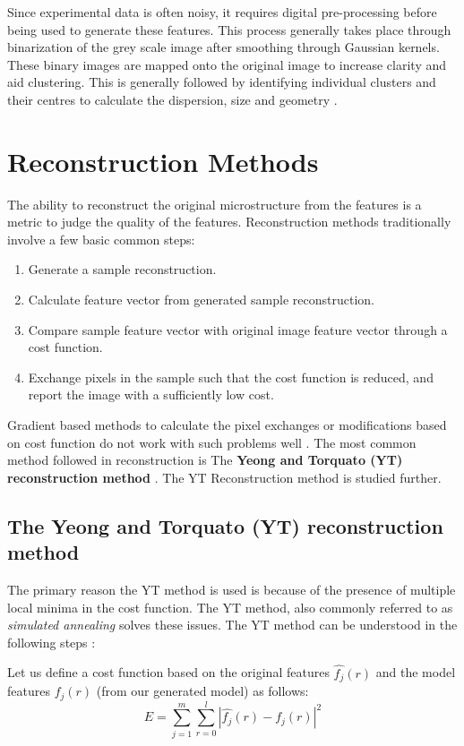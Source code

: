 \documentclass[12pt, a4paper]{report}
\begin{document}
Since experimental data is often noisy, it requires digital pre-processing before being used to generate these features. This process generally takes place through binarization of the grey scale image after smoothing through Gaussian kernels. These binary images are mapped onto the original image to increase clarity and aid clustering. This is generally followed by identifying individual clusters and their centres to calculate the dispersion, size and geometry \cite{16xu2014descriptor}. 

\section{Reconstruction Methods}
The ability to reconstruct the original microstructure from the features is a metric to judge the quality of the features. Reconstruction methods traditionally involve a few basic common steps:

\begin{enumerate}
    \item Generate a sample reconstruction.
    \item Calculate feature vector from generated sample reconstruction.
    \item Compare sample feature vector with original image feature vector through a cost function.
    \item Exchange pixels in the sample such that the cost function is reduced, and report the image with a sufficiently low cost.
\end{enumerate}

Gradient based methods to calculate the pixel exchanges or modifications based on cost function do not work with such problems well \cite{12fullwood2008gradient}. The most common method followed in reconstruction is The\textbf{ Yeong and Torquato (YT) reconstruction method} \cite{13yeong1998reconstructing}. The YT Reconstruction method is studied further. 

\subsection{The Yeong and Torquato (YT) reconstruction method}
The primary reason the YT method is used is because of the presence of multiple local minima in the cost function. The YT method, also commonly referred to as \textit{simulated annealing} solves these issues. The YT method can be understood in the following steps \cite{3bostanabad2018computational}:

Let us define a cost function based on the original features $\hat{f_j}(r)$  and the model features $f_j(r)$ (from our generated model) as follows:
\begin{equation}
E = \sum_{j=1}^{m}\sum_{r=0}^{l}|\hat{f_j}(r)-f_j(r)|^2
\end{equation}
\end{document}
